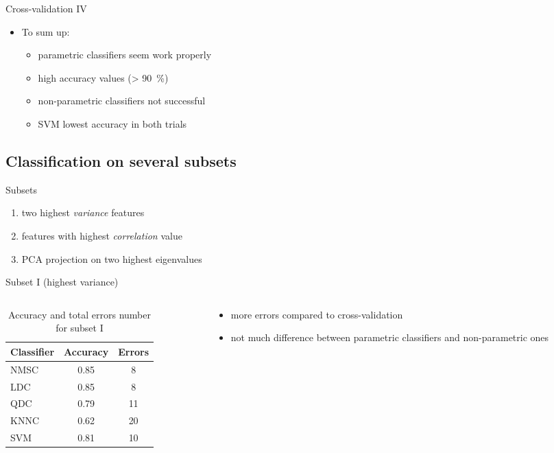 \documentclass{beamer}
\begin{document}
\begin{frame}{Cross-validation IV}
  \begin{itemize}
  \item
    To sum up:
    \begin{itemize}
    \item
      parametric classifiers seem work properly
    \item
      high accuracy values (> \SI{90}{\percent})
      \item
      non-parametric classifiers not successful
      \item
      SVM lowest accuracy in both trials
    \end{itemize}
  \end{itemize}
\end{frame}


\subsection{Classification on several subsets}

\begin{frame}{Subsets}
	\begin{enumerate}
		\item{
		two highest \emph{variance} features
		}
		\item{
		features with highest \emph{correlation} value
		}
		\item{
		PCA projection on two highest eigenvalues 
		}
	\end{enumerate}
\end{frame}

\begin{frame}{Subset I (highest variance)}
\begin{columns}[t]
\begin{column}{.5\textwidth}
\begin{table}
\begin{tabular}{l || c | c  }
Classifier & Accuracy & Errors \\
\hline \hline
NMSC & 0.85 & 8  \\ 
LDC & 0.85 & 8 \\
QDC & 0.79 & 11 \\
KNNC & 0.62 & 20 \\
SVM & 0.81 & 10
\end{tabular}
\caption{{\scriptsize Accuracy and total errors number for subset I}}
\end{table}
\end{column}
\begin{column}{.5\textwidth}
\begin{itemize}
  \item{
    more errors compared to cross-validation
    }
  \item{
    not much difference between parametric classifiers and non-parametric ones
  }
  \end{itemize}
\end{column}
\end{columns}
\end{frame}
\end{document}
